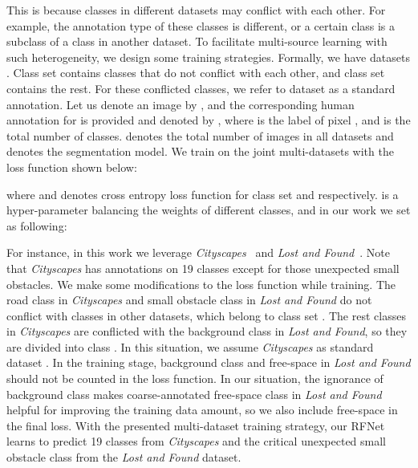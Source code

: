\documentclass[letterpaper, 10 pt, journal, twoside]{ieeetran}
\begin{document}
This is because classes in different datasets may conflict with each other. For example, the annotation type of these classes is different, or a certain class is a subclass of a class in another dataset. To facilitate multi-source learning with such heterogeneity, we design some training strategies. Formally, we have datasets . Class set  contains classes that do not conflict with each other, and class set  contains the rest. For these conflicted classes, we refer to dataset  as a standard annotation.
Let us denote an image by , and the corresponding human annotation for  is provided and denoted by , where  is the label of pixel , and  is the total number of classes.  denotes the total number of images in all datasets and  denotes the segmentation model.
We train on the joint multi-datasets with the loss function shown below:







where  and  denotes cross entropy loss function for class set  and  respectively.  is a hyper-parameter balancing the weights of different classes, and in our work we set  as following:












For instance, in this work we leverage \textit{Cityscapes}~\cite{Cordts2016Cityscapes} and \textit{Lost and Found}~\cite{pinggera2016lost}. Note that \textit{Cityscapes} has annotations on 19 classes except for those unexpected small obstacles. We make some modifications to the loss function while training. The road class in \textit{Cityscapes} and small obstacle class in \textit{Lost and Found} do not conflict with classes in other datasets, which belong to class set . The rest classes in \textit{Cityscapes} are conflicted with the background class in \textit{Lost and Found}, so they are divided into class . In this situation, we assume \textit{Cityscapes} as standard dataset . In the training stage, background class and free-space in \textit{Lost and Found} should not be counted in the loss function. In our situation, the ignorance of background class makes coarse-annotated free-space class in \textit{Lost and Found} helpful for improving the training data amount, so we also include free-space in the final loss.
With the presented multi-dataset training strategy, our RFNet learns to predict 19 classes from \textit{Cityscapes} and the critical unexpected small obstacle class from the \textit{Lost and Found} dataset.
\end{document}
